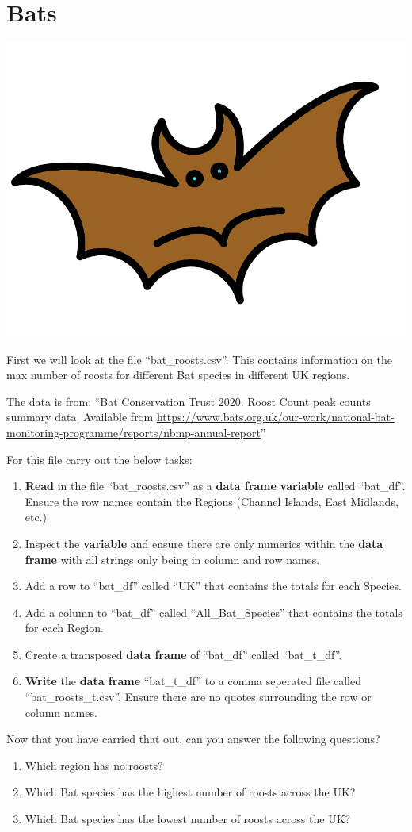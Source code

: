 \documentclass[]{book}
\providecommand{\tightlist}{%
  \setlength{\itemsep}{0pt}\setlength{\parskip}{0pt}}
\begin{document}
\section{Bats}\label{bats}

\begin{center}\includegraphics[width=0.2\linewidth]{figures/bat} \end{center}

First we will look at the file ``bat\_roosts.csv''. This contains
information on the max number of roosts for different Bat species in
different UK regions.

The data is from: ``Bat Conservation Trust 2020. Roost Count peak counts
summary data. Available from
\url{https://www.bats.org.uk/our-work/national-bat-monitoring-programme/reports/nbmp-annual-report}''

For this file carry out the below tasks:

\begin{enumerate}
\def\labelenumi{\arabic{enumi}.}
\tightlist
\item
  \textbf{Read} in the file ``bat\_roosts.csv'' as a \textbf{data frame}
  \textbf{variable} called ``bat\_df''. Ensure the row names contain the
  Regions (Channel Islands, East Midlands, etc.)
\item
  Inspect the \textbf{variable} and ensure there are only numerics
  within the \textbf{data frame} with all strings only being in column
  and row names.
\item
  Add a row to ``bat\_df'' called ``UK'' that contains the totals for
  each Species.
\item
  Add a column to ``bat\_df'' called ``All\_Bat\_Species'' that contains
  the totals for each Region.
\item
  Create a transposed \textbf{data frame} of ``bat\_df'' called
  ``bat\_t\_df''.
\item
  \textbf{Write} the \textbf{data frame} ``bat\_t\_df'' to a comma
  seperated file called ``bat\_roosts\_t.csv''. Ensure there are no
  quotes surrounding the row or column names.
\end{enumerate}

Now that you have carried that out, can you answer the following
questions?

\begin{enumerate}
\def\labelenumi{\arabic{enumi}.}
\tightlist
\item
  Which region has no roosts?
\item
  Which Bat species has the highest number of roosts across the UK?
\item
  Which Bat species has the lowest number of roosts across the UK?
\end{enumerate}
\end{document}
